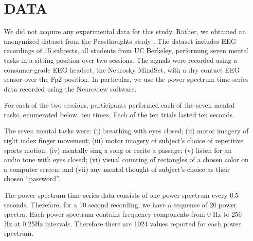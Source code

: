 \section{\uppercase{Data}}
\label{sec:data}


\noindent We did not acquire any experimental data for this study. Rather, we obtained an anonymized dataset from the Passthoughts study \cite{adams_i_2013}. The dataset includes EEG recordings of 15 subjects, all students from UC Berkeley, performing seven mental tasks in a sitting position over two sessions. The signals were recorded using a consumer-grade EEG headset, the Neurosky MindSet, with a dry contact EEG sensor over the Fp2 position. In particular, we use the power spectrum time series data recorded using the Neuroview software.


For each of the two sessions, participants performed each of the seven mental tasks, enumerated below, ten times. Each of the ten trials lasted ten seconds.

The seven mental tasks were: (i) breathing with eyes closed; (ii) motor imagery of right index finger movement; (iii) motor imagery of subject's choice of repetitive sports motion; (iv) mentally sing a song or recite a passage; (v) listen for an audio tone with eyes closed; (vi) visual counting of rectangles of a chosen color on a computer screen; and (vii) any mental thought of subject's choice as their chosen ``password''.


The power spectrum time series data consists of one power spectrum every 0.5 seconds. Therefore, for a 10 second recording, we have a sequence of 20 power spectra. Each power spectrum contains frequency components from 0 Hz to 256 Hz at 0.25Hz intervals. Therefore there are 1024 values reported for each power spectrum.



